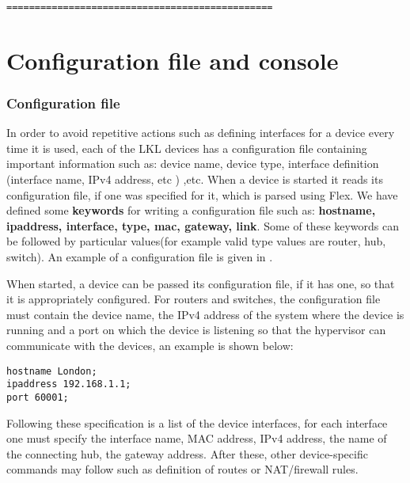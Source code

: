 {{\begin{lstlisting}
===============================================
\end{lstlisting}
 

\section{Configuration file and console}
\label{sec:config}

\subsubsection{Configuration file}
\label{subsec:config-file}
In order to avoid repetitive actions such as defining interfaces for a device every time it is used, each 
of the LKL devices has a configuration file containing important information such as: device name, 
device type, interface definition (interface name, IPv4 address, etc ) ,etc. When a device is started it 
reads its configuration file, if one was specified for it, which is parsed using Flex. We have defined some 
\textbf{keywords} for writing a configuration file such as: \textbf{hostname, ipaddress, 
interface, type, mac, gateway, link}. Some of these keywords can be followed by 
particular values(for example valid type values are router, hub, switch). An example of a 
configuration file is given in .

When started, a device can be passed its configuration file, if it has one, 
so that it is appropriately configured. For routers and switches, the configuration 
file must contain the device name, the IPv4 address of the system where the device is running and a port 
on which the device is listening so that the hypervisor can communicate with the devices, an example is shown below:
\lstset{language=TeX,caption=Fields of Configuration File,label=lst:config-file}
\begin{lstlisting}
hostname London;
ipaddress 192.168.1.1;
port 60001;
\end{lstlisting}
Following these specification is a list of the device interfaces, for each interface one must specify 
the interface name, MAC address, IPv4 address, the name of the connecting hub, the gateway address. 
After these, other device-specific commands may follow such as definition of routes or NAT/firewall rules.

}}
